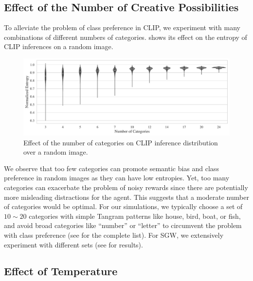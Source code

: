 
\subsection{Effect of the Number of Creative Possibilities}
\label{sec:clip-categories}
To alleviate the problem of class preference in CLIP, we experiment with many combinations of different numbers of categories.
 shows its effect on the entropy of CLIP inferences on a random image.

\begin{figure}[H]
    \centering
    \includegraphics[width=\textwidth]{images/category_comparison_tangram.pdf}
    \caption{Effect of the number of categories on CLIP inference distribution over a random image.}
    \label{fig:clip-categories}
\end{figure}
\vspace{-7pt}
We observe that too few categories can promote semantic bias and class preference in random images as they can have low entropies. Yet, too many categories can exacerbate the problem of noisy rewards since there are potentially more misleading distractions for the agent.
This suggests that a moderate number of categories would be optimal.
For our simulations, we typically choose a set of \(10 \sim 20\) categories with simple Tangram patterns like house, bird, boat, or fish, and avoid broad categories like ``number'' or ``letter'' to circumvent the problem with class preference (see  for the complete list).
For SGW, we extensively experiment with different sets (see  for results).


\subsection{Effect of Temperature}
\label{sec:reg-temperature}


